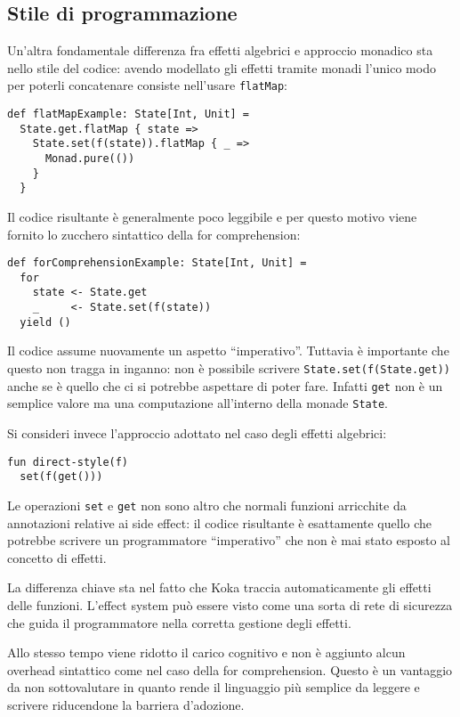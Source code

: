\subsection{Stile di programmazione}
Un'altra fondamentale differenza fra effetti algebrici e approccio monadico sta nello stile del codice: avendo modellato gli effetti tramite monadi l'unico modo per poterli concatenare consiste nell'usare \lstinline{flatMap}:
\begin{lstlisting}[language=scala3]
def flatMapExample: State[Int, Unit] =
  State.get.flatMap { state =>
    State.set(f(state)).flatMap { _ => 
      Monad.pure(())
    }
  }
\end{lstlisting}
Il codice risultante è generalmente poco leggibile e per questo motivo viene fornito lo zucchero sintattico della for comprehension:
\begin{lstlisting}[language=scala3]
def forComprehensionExample: State[Int, Unit] =
  for
    state <- State.get
    _     <- State.set(f(state))
  yield ()
\end{lstlisting}
Il codice assume nuovamente un aspetto ``imperativo''. Tuttavia è importante che questo non tragga in inganno: non è possibile scrivere
\lstinline{State.set(f(State.get))} anche se è quello che ci si potrebbe aspettare di poter fare.
Infatti \lstinline{get} non è un semplice valore ma una computazione all'interno della monade \lstinline{State}.

Si consideri invece l'approccio adottato nel caso degli effetti algebrici:
\begin{lstlisting}[language=koka]
fun direct-style(f)
  set(f(get()))
\end{lstlisting}

Le operazioni \lstinline{set} e \lstinline{get} non sono altro che normali funzioni arricchite da annotazioni relative ai side effect: il codice risultante è esattamente quello che potrebbe scrivere un programmatore ``imperativo'' che non è mai stato esposto al concetto di effetti.

La differenza chiave sta nel fatto che Koka traccia automaticamente gli effetti delle funzioni. L'effect system può essere visto come una sorta di rete di sicurezza che guida il programmatore nella corretta gestione degli effetti.

Allo stesso tempo viene ridotto il carico cognitivo e non è aggiunto alcun overhead sintattico come nel caso della for comprehension.
Questo è un vantaggio da non sottovalutare in quanto rende il linguaggio più semplice da leggere e scrivere riducendone la barriera d'adozione.


